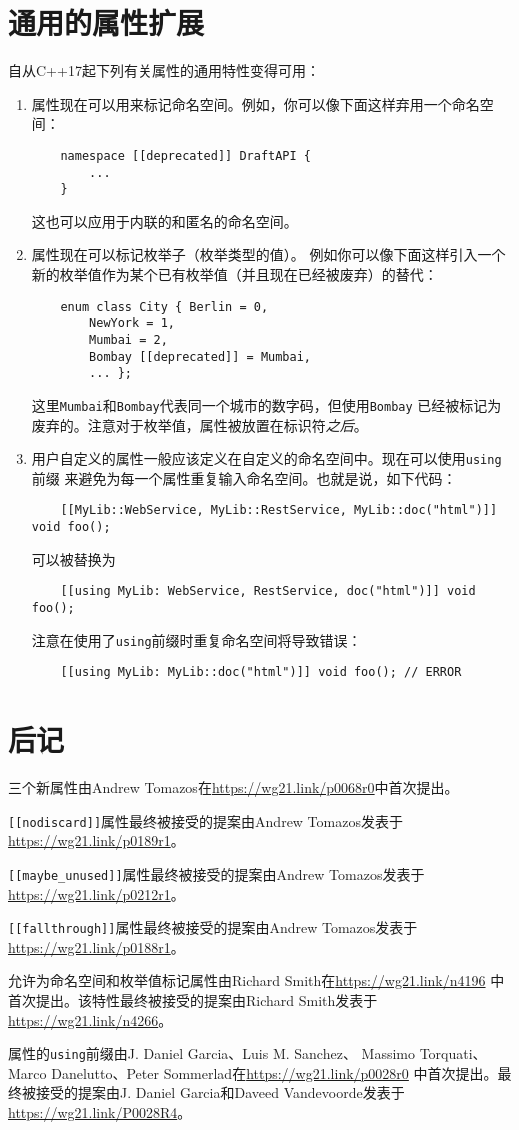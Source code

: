 \section{通用的属性扩展}
自从C++17起下列有关属性的通用特性变得可用：
\begin{enumerate}
    \item 属性现在可以用来标记命名空间。例如，你可以像下面这样弃用一个命名空间：
    \begin{lstlisting}
    namespace [[deprecated]] DraftAPI {
        ...
    }
    \end{lstlisting}
    这也可以应用于内联的和匿名的命名空间。
    \item 属性现在可以标记枚举子（枚举类型的值）。
    例如你可以像下面这样引入一个新的枚举值作为某个已有枚举值（并且现在已经被废弃）的替代：
    \begin{lstlisting}
    enum class City { Berlin = 0,
        NewYork = 1,
        Mumbai = 2,
        Bombay [[deprecated]] = Mumbai,
        ... };
    \end{lstlisting}
    这里\texttt{Mumbai}和\texttt{Bombay}代表同一个城市的数字码，但使用\texttt{Bombay}
    已经被标记为废弃的。注意对于枚举值，属性被放置在标识符\emph{之后}。
    \item 用户自定义的属性一般应该定义在自定义的命名空间中。现在可以使用\texttt{using}前缀
    来避免为每一个属性重复输入命名空间。也就是说，如下代码：
    \begin{lstlisting}
    [[MyLib::WebService, MyLib::RestService, MyLib::doc("html")]] void foo();
    \end{lstlisting}
    可以被替换为
    \begin{lstlisting}
    [[using MyLib: WebService, RestService, doc("html")]] void foo();
    \end{lstlisting}
    注意在使用了\texttt{using}前缀时重复命名空间将导致错误：
    \begin{lstlisting}
    [[using MyLib: MyLib::doc("html")]] void foo(); // ERROR
    \end{lstlisting}
\end{enumerate}

\section{后记}
三个新属性由Andrew Tomazos在\url{https://wg21.link/p0068r0}中首次提出。

\texttt{[[nodiscard]]}属性最终被接受的提案由Andrew Tomazos发表于
\url{https://wg21.link/p0189r1}。

\texttt{[[maybe\_unused]]}属性最终被接受的提案由Andrew Tomazos发表于
\url{https://wg21.link/p0212r1}。

\texttt{[[fallthrough]]}属性最终被接受的提案由Andrew Tomazos发表于
\url{https://wg21.link/p0188r1}。

允许为命名空间和枚举值标记属性由Richard Smith在\url{https://wg21.link/n4196}
中首次提出。该特性最终被接受的提案由Richard Smith发表于\url{https://wg21.link/n4266}。

属性的\texttt{using}前缀由J. Daniel Garcia、Luis M. Sanchez、
Massimo Torquati、Marco Danelutto、Peter Sommerlad在\url{https://wg21.link/p0028r0}
中首次提出。最终被接受的提案由J. Daniel Garcia和Daveed Vandevoorde发表于
\url{https://wg21.link/P0028R4}。